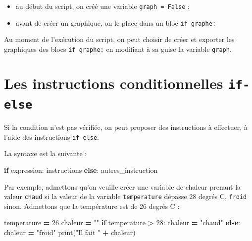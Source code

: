 \documentclass[12pt,]{book}
\newenvironment{Shaded}{\begin{snugshade}}{\end{snugshade}}
\newcommand{\DecValTok}[1]{\textcolor[rgb]{0.00,0.00,0.81}{#1}}
\newcommand{\StringTok}[1]{\textcolor[rgb]{0.31,0.60,0.02}{#1}}
\newcommand{\ControlFlowTok}[1]{\textcolor[rgb]{0.13,0.29,0.53}{\textbf{#1}}}
\newcommand{\OperatorTok}[1]{\textcolor[rgb]{0.81,0.36,0.00}{\textbf{#1}}}
\newcommand{\BuiltInTok}[1]{#1}
\newcommand{\NormalTok}[1]{#1}
\providecommand{\tightlist}{%
  \setlength{\itemsep}{0pt}\setlength{\parskip}{0pt}}
\numberwithin{equation}{section}
\numberwithin{countremarque}{section}
\begin{document}
\begin{itemize}
\tightlist
\item
  au début du script, on créé une variable \texttt{graph\ =\ False} ;
\item
  avant de créer un graphique, on le place dans un bloc
  \texttt{if\ graphe:}
\end{itemize}

Au moment de l'exécution du script, on peut choisir de créer et exporter
les graphiques des blocs \texttt{if\ graphe:} en modifiant à sa guise la
variable \texttt{graph}.

\section{\texorpdfstring{Les instructions conditionnelles
\texttt{if-else}}{Les instructions conditionnelles if-else}}\label{les-instructions-conditionnelles-if-else}

Si la condition n'est pas vérifiée, on peut proposer des instructions à
effectuer, à l'aide des instructions \texttt{if-else}.

La syntaxe est la suivante :

\begin{Shaded}
\begin{Highlighting}[]
\ControlFlowTok{if}\NormalTok{ expression:}
\NormalTok{  instructions}
\ControlFlowTok{else}\NormalTok{:}
\NormalTok{  autres_instruction}
\end{Highlighting}
\end{Shaded}

Par exemple, admettons qu'on veuille créer une variable de chaleur
prenant la valeur \texttt{chaud} si la valeur de la variable
\texttt{temperature} dépasse 28 degrés C, \texttt{froid} sinon.
Admettons que la température est de 26 degrés C :

\begin{Shaded}
\begin{Highlighting}[]
\NormalTok{temperature }\OperatorTok{=} \DecValTok{26}
\NormalTok{chaleur }\OperatorTok{=} \StringTok{""}
\ControlFlowTok{if}\NormalTok{ temperature }\OperatorTok{>} \DecValTok{28}\NormalTok{:}
\NormalTok{  chaleur }\OperatorTok{=} \StringTok{"chaud"}
\ControlFlowTok{else}\NormalTok{:}
\NormalTok{  chaleur }\OperatorTok{=} \StringTok{"froid"}
\BuiltInTok{print}\NormalTok{(}\StringTok{"Il fait "} \OperatorTok{+}\NormalTok{ chaleur)}
\end{Highlighting}
\end{Shaded}
\end{document}

